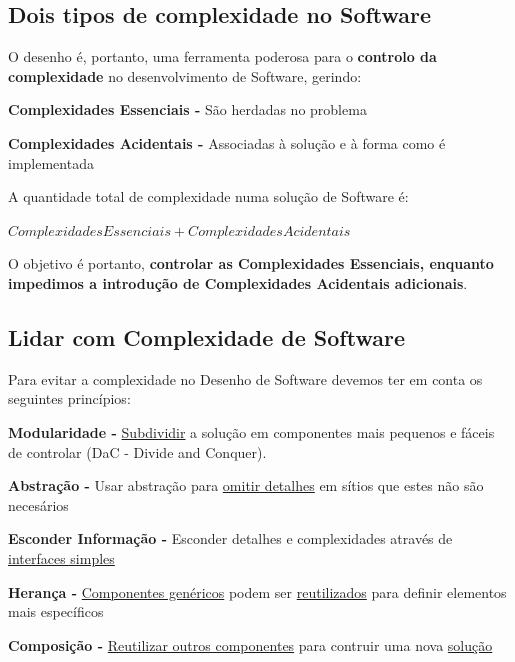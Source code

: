 \documentclass{article}
\begin{document}
\subsection{Dois tipos de complexidade no Software}

\par
O desenho é, portanto, uma ferramenta poderosa para o \textbf{controlo da complexidade}
no desenvolvimento de Software, gerindo:

\begin{flushleft}
    \textbf{Complexidades Essenciais -} São herdadas no problema

    \textbf{Complexidades Acidentais -} Associadas à solução e à forma como é implementada
\end{flushleft}

\par
A quantidade total de complexidade numa solução de Software é:

\begin{center}
    $Complexidades Essenciais + Complexidades Acidentais$
\end{center}

O objetivo é portanto, \textbf{controlar as Complexidades Essenciais, enquanto impedimos
a introdução de Complexidades Acidentais adicionais}.

\subsection{Lidar com Complexidade de Software}

Para evitar a complexidade no Desenho de Software devemos ter em conta os seguintes
princípios:

\begin{flushleft}
    \textbf{Modularidade -} \uline{Subdividir} a solução em componentes mais pequenos e fáceis
    de controlar (DaC - Divide and Conquer).

    \textbf{Abstração -} Usar abstração para \uline{omitir detalhes} em sítios que estes não são
    necesários

    \textbf{Esconder Informação -} Esconder detalhes e complexid\uline{}ades através de \uline{interfaces
    simples}

    \textbf{Herança -} \uline{Componentes genéricos} podem ser \uline{reutilizados} para definir
    elementos mais específicos

    \textbf{Composição -} \uline{Reutilizar outros componentes} para contruir uma nova \uline{solução}
\end{flushleft}
\end{document}

